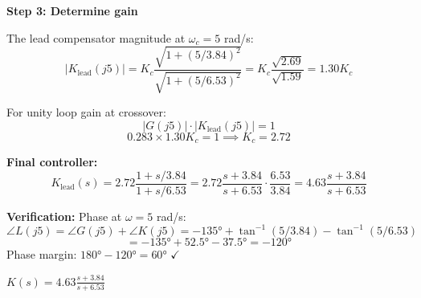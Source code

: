 \begin{example}
\textbf{Step 3: Determine gain}

The lead compensator magnitude at $\omega_c = 5$ rad/s:
\begin{equation*}
|K_{\text{lead}}(j5)| = K_c \frac{\sqrt{1 + (5/3.84)^2}}{\sqrt{1 + (5/6.53)^2}} = K_c \frac{\sqrt{2.69}}{\sqrt{1.59}} = 1.30 K_c
\end{equation*}

For unity loop gain at crossover:
\begin{equation*}
|G(j5)| \cdot |K_{\text{lead}}(j5)| = 1
\end{equation*}
\begin{equation*}
0.283 \times 1.30 K_c = 1 \implies K_c = 2.72
\end{equation*}

\textbf{Final controller:}
\begin{equation*}
K_{\text{lead}}(s) = 2.72 \frac{1 + s/3.84}{1 + s/6.53} = 2.72 \frac{s + 3.84}{s + 6.53} \cdot \frac{6.53}{3.84} = 4.63 \frac{s + 3.84}{s + 6.53}
\end{equation*}

\textbf{Verification:}
Phase at $\omega = 5$ rad/s:
\begin{equation*}
\angle L(j5) = \angle G(j5) + \angle K(j5) = -135° + \tan^{-1}(5/3.84) - \tan^{-1}(5/6.53)
\end{equation*}
\begin{equation*}
= -135° + 52.5° - 37.5° = -120°
\end{equation*}
Phase margin: $180° - 120° = 60°$ $\checkmark$

$\boxed{K(s) = 4.63 \frac{s + 3.84}{s + 6.53}}$
\end{example}

